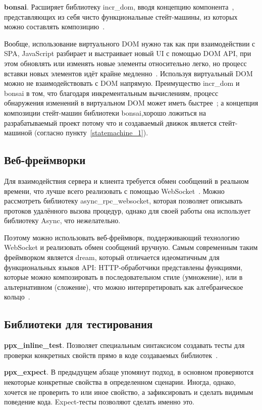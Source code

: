 \textbf{bonsai}. Расширяет библиотеку incr\_dom, вводя концепцию компонента~\cite{bonsai-history},
представляющих из себя чисто функциональные стейт-машины, из которых можно составлять композицию~\cite{janestreet-bonsai}.

Вообще, использование виртуального DOM нужно так как при взаимодействии с SPA, JavaScript разбирает и выстраивает новый UI
с помощью DOM API, при этом обновлять или изменять новые элементы относительно легко, но процесс вставки новых элементов
идёт крайне медленно~\cite[с.~72]{react-book}. Используя виртуальный DOM можно не взаимодействовать с DOM напрямую.
Преимущество incr\_dom и bonsai в том, что благодаря инкрементальным вычислениям, процесс обнаружения изменений в
виртуальном DOM может иметь быстрее~\cite{minsky-incrdom};
а концепция композиции стейт-машин библиотеки bonsai,хорошо ложиться на
разрабатываемый проект потому что и создаваемый движок является стейт-машиной (согласно пункту~\ref{statemachine_1}).

\subsection{Веб-фреймворки}

Для взаимодействия сервера и клиента требуется обмен сообщений в реальном времени, что лучше всего реализовать
с помощью WebSocket~\cite{mdn-websocket}. Можно рассмотреть библиотеку async\_rpc\_websocket,
которая позволяет описывать протоков удалённого вызова процедур, однако
для своей работы она использует библиотеку Async, что нежелательно.

Поэтому можно использовать веб-фреймворк, поддерживающий технологию WebSocket и реализовать обмен сообщений вручную.
Самым современным таким фреймворком является dream, который отличается идеоматичным для функциональных языков API:
HTTP-обработчики представлены функциями, которые можно композировать в последовательном стиле (умножение),
или в альтернативном (сложение), что можно интерпретировать как алгебраическое кольцо~\cite{dream}.

\subsection{Библиотеки для тестирования}

\textbf{ppx\_inline\_test}. Позволяет специальным синтаксисом создавать тесты
для проверки конкретных свойств
прямо в коде создаваемых библиотек~\cite{rwo-testing}.

\textbf{ppx\_expect}. В предыдущем абзаце упомянут подход, в основном проверяются некоторые конкретные
свойства в определенном сценарии. Иногда, однако, хочется не проверить то или иное свойство, а зафиксировать
и сделать видимым поведение кода. Expect-тесты позволяют сделать именно это.~\cite{rwo-testing}

